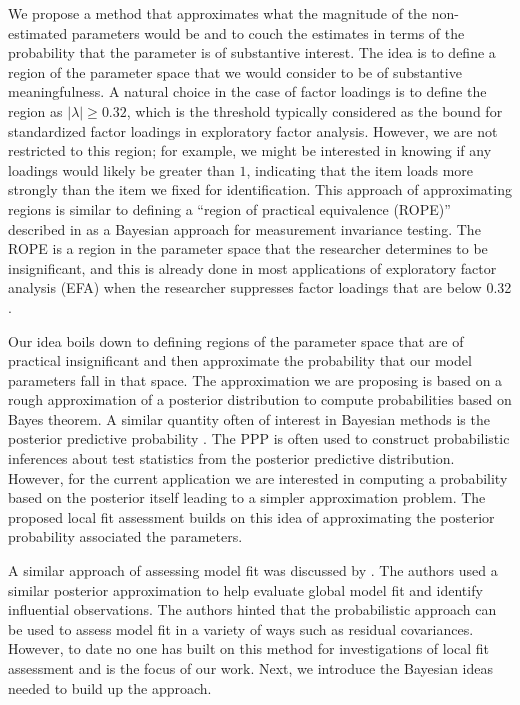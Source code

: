 \documentclass[man, noextraspace, floatsintext, 12pt]{apa7}
\begin{document}
We propose a method that approximates what the magnitude of the non-estimated parameters would be and to couch the estimates in terms of the probability that the parameter is of substantive interest.
The idea is to define a region of the parameter space that we would consider to be of substantive meaningfulness.
A natural choice in the case of factor loadings is to define the region as $\vert \lambda \vert \geq 0.32$, which is the threshold typically considered as the bound for standardized factor loadings in exploratory factor analysis.
However, we are not restricted to this region; for example, we might be interested in knowing if any loadings would likely be greater than $1$, indicating that the item loads more strongly than the item we fixed for identification.
This approach of approximating regions is similar to defining a ``region of practical equivalence (ROPE)'' described in \textcite{Shi2019} as a Bayesian approach for measurement invariance testing.
The ROPE is a region in the parameter space that the researcher determines to be insignificant, and this is already done in most applications of exploratory factor analysis (EFA) when the researcher suppresses factor loadings that are below 0.32 \citep{Benson1998}.

Our idea boils down to defining regions of the parameter space that are of practical insignificant and then approximate the probability that our model parameters fall in that space.
The approximation we are proposing is based on a rough approximation of a posterior distribution to compute probabilities based on Bayes theorem.
A similar quantity often of interest in Bayesian methods is the posterior predictive probability \citep[PPP or $p$-value, ][]{Gelman1996, Rubin1996}.
The PPP is often used to construct probabilistic inferences about test statistics from the posterior predictive distribution.
However, for the current application we are interested in computing a probability based on the posterior itself leading to a simpler approximation problem.
The proposed local fit assessment builds on this idea of approximating the posterior probability associated the parameters.
 
A similar approach of assessing model fit was discussed by \textcite{Lee2016}.
The authors used a similar posterior approximation to help evaluate global model fit and identify influential observations.
The authors hinted that the probabilistic approach can be used to assess model fit in a variety of ways such as residual covariances.
However, to date no one has built on this method for investigations of local fit assessment and is the focus of our work.
Next, we introduce the Bayesian ideas needed to build up the approach. 
\end{document}
